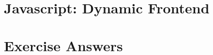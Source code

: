 \documentclass[a4paper,10pt,hidelinks]{report}
\begin{document}
    \chapter{Javascript: Dynamic Frontend} \label{ch:javascript-dynamic-frontend}
    
    
    
    
    

    \appendix

    \chapter{Exercise Answers}
    
    
    
    
\end{document}
